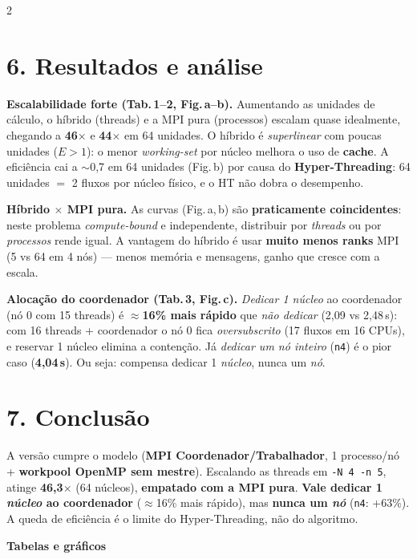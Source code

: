 \documentclass[10pt,a4paper]{article}
\begin{document}
\begin{multicols}{2}
\section*{6. Resultados e análise}
\textbf{Escalabilidade forte (Tab.\,1--2, Fig.\,a--b).} Aumentando as unidades de cálculo, o híbrido (threads) e a MPI pura (processos) escalam quase idealmente, chegando a \textbf{46$\times$} e \textbf{44$\times$} em 64 unidades. O híbrido é \emph{superlinear} com poucas unidades ($E>1$): o menor \emph{working-set} por núcleo melhora o uso de \textbf{cache}. A eficiência cai a $\sim$0,7 em 64 unidades (Fig.\,b) por causa do \textbf{Hyper-Threading}: 64 unidades $=$ 2 fluxos por núcleo físico, e o HT não dobra o desempenho.

\textbf{Híbrido $\times$ MPI pura.} As curvas (Fig.\,a,\,b) são \textbf{praticamente coincidentes}: neste problema \emph{compute-bound} e independente, distribuir por \emph{threads} ou por \emph{processos} rende igual. A vantagem do híbrido é usar \textbf{muito menos ranks} MPI (5 vs 64 em 4 nós) --- menos memória e mensagens, ganho que cresce com a escala.

\textbf{Alocação do coordenador (Tab.\,3, Fig.\,c).} \emph{Dedicar 1 núcleo} ao coordenador (nó 0 com 15 threads) é \textbf{$\approx$16\% mais rápido} que \emph{não dedicar} (2,09 vs 2,48\,s): com 16 threads + coordenador o nó 0 fica \emph{oversubscrito} (17 fluxos em 16 CPUs), e reservar 1 núcleo elimina a contenção. Já \emph{dedicar um nó inteiro} (\texttt{n4}) é o pior caso (\textbf{4,04\,s}). Ou seja: compensa dedicar 1 \emph{núcleo}, nunca um \emph{nó}.

\section*{7. Conclusão}
A versão cumpre o modelo (\textbf{MPI Coordenador/Trabalhador}, 1 processo/nó + \textbf{workpool OpenMP sem mestre}). Escalando as threads em \texttt{-N 4 -n 5}, atinge \textbf{46,3$\times$} (64 núcleos), \textbf{empatado com a MPI pura}. \textbf{Vale dedicar 1 \emph{núcleo} ao coordenador} ($\approx$16\% mais rápido), mas \textbf{nunca um \emph{nó}} (\texttt{n4}: +63\%). A queda de eficiência é o limite do Hyper-Threading, não do algoritmo.

\end{multicols}

\newpage
\begin{center}\textbf{Tabelas e gráficos}\end{center}
\end{document}
